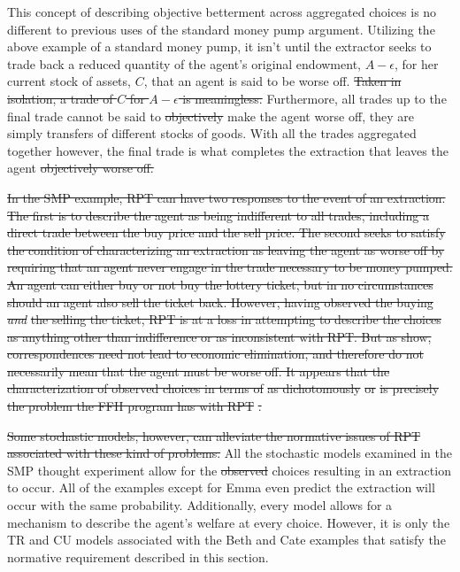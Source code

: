 \documentclass[11pt,a4paper]{report}
\providecommand{\DIFaddtex}[1]{{\protect\color{blue}\uwave{#1}}} %
\providecommand{\DIFdeltex}[1]{{\protect\color{red}\sout{#1}}}                      %
\providecommand{\DIFaddbegin}{} %
\providecommand{\DIFaddend}{} %
\providecommand{\DIFdelbegin}{} %
\providecommand{\DIFdelend}{} %
\providecommand{\DIFadd}[1]{\texorpdfstring{\DIFaddtex{#1}}{#1}} %
\providecommand{\DIFdel}[1]{\texorpdfstring{\DIFdeltex{#1}}{}} %
\newcommand{\DIFscaledelfig}{0.5}
\newlength{\DIFdelgraphicswidth} %
\newlength{\DIFdelgraphicsheight} %
\newcommand{\DIFaddincludegraphics}[2][]{{\color{blue}\fbox{\DIFOincludegraphics[#1]{#2}}}} %
\newcommand{\DIFdelincludegraphics}[2][]{%
\sbox{\DIFdelgraphicsbox}{\DIFOincludegraphics[#1]{#2}}%
\settoboxwidth{\DIFdelgraphicswidth}{\DIFdelgraphicsbox} %
\settoboxtotalheight{\DIFdelgraphicsheight}{\DIFdelgraphicsbox} %
\scalebox{\DIFscaledelfig}{%
\parbox[b]{\DIFdelgraphicswidth}{\usebox{\DIFdelgraphicsbox}\\[-\baselineskip] \rule{\DIFdelgraphicswidth}{0em}}\llap{\resizebox{\DIFdelgraphicswidth}{\DIFdelgraphicsheight}{%
\setlength{\unitlength}{\DIFdelgraphicswidth}%
\begin{picture}(1,1)%
\thicklines\linethickness{2pt} %
{\color[rgb]{1,0,0}\put(0,0){\framebox(1,1){}}}%
{\color[rgb]{1,0,0}\put(0,0){\line( 1,1){1}}}%
{\color[rgb]{1,0,0}\put(0,1){\line(1,-1){1}}}%
\end{picture}%
}\hspace*{3pt}}} %
} %
\DeclareRobustCommand{\DIFaddbegin}{\DIFOaddbegin \let\includegraphics\DIFaddincludegraphics} %
\DeclareRobustCommand{\DIFaddend}{\DIFOaddend \let\includegraphics\DIFOincludegraphics} %
\DeclareRobustCommand{\DIFdelbegin}{\DIFOdelbegin \let\includegraphics\DIFdelincludegraphics} %
\DeclareRobustCommand{\DIFdelend}{\DIFOaddend \let\includegraphics\DIFOincludegraphics} %
\begin{document}
This concept of describing objective betterment across aggregated choices is no different to previous uses of the standard money pump argument.
Utilizing the above example of a standard money pump, it isn't until the extractor seeks to trade back a reduced quantity of the agent's original endowment, $A - \epsilon$, for her current stock of assets, $C$, that an agent is said to be worse off.
\DIFdelbegin \DIFdel{Taken in isolation, a trade of $C$ for $A - \epsilon$ is meaningless.
}\DIFdelend Furthermore, all trades up to the final trade cannot be said to \DIFdelbegin \DIFdel{objectively }\DIFdelend \DIFaddbegin \DIFadd{necessarily }\DIFaddend make the agent worse off, they are simply transfers of different stocks of goods.
With all the trades aggregated together however, the final trade is what completes the extraction that leaves the agent \DIFdelbegin \DIFdel{objectively worse off.
}\DIFdelend \DIFaddbegin \DIFadd{with a smaller stock of assets.
}\DIFaddend 

\DIFdelbegin \DIFdel{In the SMP example, RPT can have two responses to the event of an extraction.
The first is to describe the agent as being indifferent to all trades, including a direct trade between the buy price and the sell price.
The second seeks to satisfy the condition of characterizing an extraction as leaving the agent as worse off by requiring that an agent never engage in the trade necessary to be money pumped.
An agent can either buy or not buy the lottery ticket, but in no circumstances should an agent also sell the ticket back.
However, having observed the buying }\textit{\DIFdel{and}} %
\DIFdel{the selling the ticket, RPT is at a loss in attempting to describe the choices as anything other than indifference or as inconsistent with RPT.
But as \textcite{Cubitt2001} show, }%
\DIFdel{correspondences need not lead to economic elimination, and therefore do not necessarily mean that the agent must be worse off.
It appears that the characterization of observed choices in terms of }%
\DIFdel{as dichotomously }%
\DIFdel{or }%
\DIFdel{is precisely the problem the FFH program has with RPT }%
\DIFdel{.
}%

\DIFdel{Some stochastic models, however, can alleviate the normative issues of RPT associated with these kind of problems.
}\DIFdelend All the stochastic models examined in the SMP thought experiment allow for the \DIFdelbegin \DIFdel{observed }\DIFdelend choices resulting in an extraction to occur.
All of the examples except for Emma even predict the extraction will occur with the same probability.
Additionally, every model allows for a mechanism to describe the agent's welfare at every choice.
However, it is only the TR and CU models associated with the Beth and Cate examples that satisfy the normative requirement described in this section.
\end{document}
